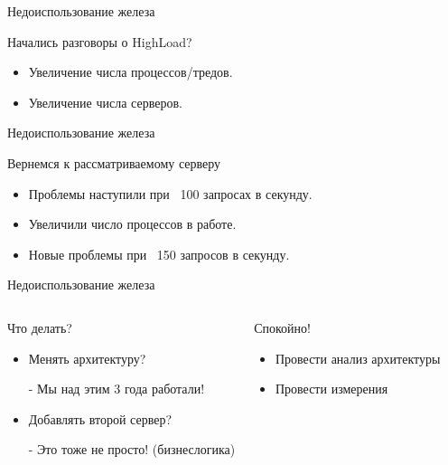 \documentclass[aspectratio=169]{beamer}
\begin{document}
\begin{frame}{Недоиспользование железа}
    \begin{block}{Начались разговоры о HighLoad?}
        \begin{itemize}
            \pause
            \item Увеличение числа процессов/тредов.
            
            \pause
            \item Увеличение числа серверов.
        \end{itemize}
    \end{block}
\end{frame}

\begin{frame}{Недоиспользование железа}
    \begin{block}{Вернемся к рассматриваемому серверу}
        \begin{itemize}
            \pause
            \item Проблемы наступили при ~100 запросах в секунду.
            
            \pause
            \item Увеличили число процессов в работе.

            \pause
            \item Новые проблемы при ~150 запросов в секунду.
        \end{itemize}
    \end{block}
\end{frame}

\begin{frame}{Недоиспользование железа}

    \begin{columns}
        \begin{block}{Что делать?}
            \begin{itemize}
                \pause\item Менять архитектуру?
                    \pause\par - Мы над этим 3 года работали!

                \pause\item Добавлять второй сервер?
                    \pause\par - Это тоже не просто! (бизнеслогика)
            \end{itemize}
        \end{block}

        \begin{block}{Спокойно!}
            \begin{itemize}
                \pause\item Провести анализ архитектуры
                \pause\item Провести измерения
            \end{itemize}
        \end{block}
    \end{columns}
\end{frame}
\end{document}
